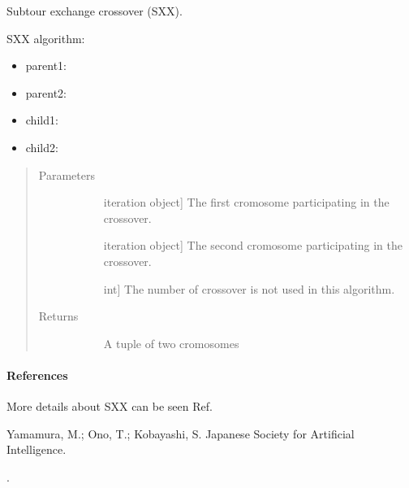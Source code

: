 \documentclass[letterpaper,10pt,english]{sphinxmanual}
\begin{document}

\begin{fulllineitems}
\label{\detokenize{pygace:pygace.ga.subtour_exchange_crossover}}
Subtour exchange crossover (SXX).

SXX algorithm:
\begin{itemize}
\item {} 
parent1: 

\item {} 
parent2: 

\item {} 
child1: 

\item {} 
child2: 

\end{itemize}
\begin{quote}\begin{description}
\item[{Parameters}] \leavevmode\begin{description}
\item[{}] \leavevmode{[}iteration object{]}
The first cromosome participating in the crossover.

\item[{}] \leavevmode{[}iteration object{]}
The second cromosome participating in the crossover.

\item[{}] \leavevmode{[}int{]}
The number of crossover is not used in this algorithm.

\end{description}

\item[{Returns}] \leavevmode\begin{description}
\item[{}] \leavevmode
A tuple of two cromosomes

\end{description}

\end{description}\end{quote}
\paragraph{References}

More details about SXX can be seen Ref. %
\begin{footnote}[6]\sphinxAtStartFootnote
Yamamura, M.; Ono, T.; Kobayashi, S. Japanese Society for Artificial
Intelligence.
%
\end{footnote}.

\end{fulllineitems}
\end{document}

